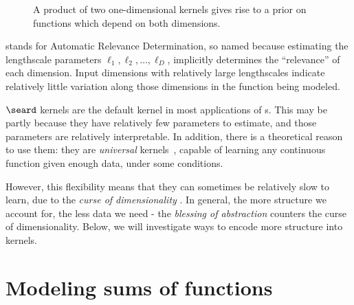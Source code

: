 \begin{figure}[ht!]
\begin{tabular}{ccccccc}
\end{tabular}
\caption[A product of squared-exponential kernels across different dimensions]{
A product of two one-dimensional kernels gives rise to a prior on functions which depend on both dimensions.
}
\label{fig:product-of-se-kernels}
\end{figure}

\ARD{} stands for Automatic Relevance Determination, so named because estimating the lengthscale parameters $\ell_1, \ell_2, \dots, \ell_D$, implicitly determines the ``relevance'' of each dimension.
Input dimensions with relatively large lengthscales indicate relatively little variation along those dimensions in the function being modeled.

$\seard$ kernels are the default kernel in most applications of \gp{}s.
This may be partly because they have relatively few parameters to estimate, and those parameters are relatively interpretable.
In addition, there is a theoretical reason to use them: they are \emph{universal} kernels~\citep{micchelli2006universal}, capable of learning any continuous function given enough data, under some conditions.

However, this flexibility means that they can sometimes be relatively slow to learn, due to the \emph{curse of dimensionality} \citep{bellman1956dynamic}.
In general, the more structure we account for, the less data we need - the \emph{blessing of abstraction} \citep{goodman2011learning} counters the curse of dimensionality.
Below, we will investigate ways to encode more structure into kernels.



\section{Modeling sums of functions}

